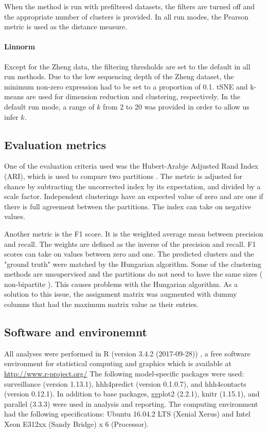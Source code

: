 \documentclass[12pt, a4paper]{article}\usepackage[]{graphicx}\usepackage[]{color}
\begin{document}
When the method is run with prefiltered datasets, the filters are turned off and the appropriate number of clusters is provided. 
In all run modes, the Pearson metric is used as the distance measure.  

\paragraph{Linnorm}
Except for the  Zheng data, the filtering thresholds are set to the default in all run methods. Due to the low sequencing depth of the Zheng dataset, the minimum non-zero expression had to be set to a proportion of 0.1. tSNE and k-means are used for dimension reduction and clustering, respectively. In the default run mode, a range of $k$ from 2 to 20 was provided in order to allow us infer $k$.
\subsection{Evaluation metrics}
One of the evaluation criteria used was the Hubert-Arabje Adjusted Rand Index (ARI), which is used to compare two partitions \citep{hubert1985comparing}. The metric is adjusted for chance by subtracting the uncorrected index by its expectation, and divided by a scale factor. Independent clusterings have an expected value of zero and are one if there is full agreement between the partitions. The index can take on negative values.

Another metric is the F1 score. It is the weighted average mean between precision and recall. The weights are defined as the inverse of the precision and recall. F1 scores can take on values between zero and  one. The predicted clusters and the "ground truth" were matched by the Hungarian algorithm. Some of the clustering methods are unsupervised and the partitions do not need to have the same sizes ( non-bipartite ). This causes problems with the Hungarian algorithm. As a solution to this issue, the assignment matrix was augmented with dummy columns that had the maximum matrix value as their entries.
\subsection{Software and environemnt}
All analyses were performed in R (version 3.4.2 (2017-09-28)) \citep{R}, a free software environment for statistical computing and graphics which is available at \url{http://www.r-project.org/} The following model-specific packages were used: surveillance (version 1.13.1), hhh4predict (version 0.1.0.7), and hhh4contacts (version 0.12.1). In addition to base packages, ggplot2 (2.2.1), knitr (1.15.1), and parallel (3.3.3) were used in analysis and reporting. The computing environment had the following specifications: Ubuntu 16.04.2 LTS (Xenial Xerus) and Intel Xeon E312xx (Sandy Bridge) x 6 (Processor).
\end{document}
